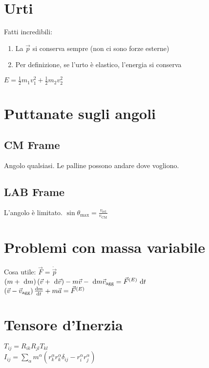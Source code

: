 \documentclass[a4paper,NoNotes,GeneralMath,12pt]{stdmdoc}
\begin{document}
	\section*{Urti}
	Fatti incredibili:
	\begin{enumerate}
		\item La $\vec{p}$ si conserva sempre (non ci sono forze esterne)
		\item Per definizione, se l'urto è elastico, l'energia si conserva
	\end{enumerate}
	$E = \frac{1}{2} m_1 v_1^2 + \frac{1}{2} m_2 v_2^2$

	\section*{Puttanate sugli angoli}
	\subsection*{CM Frame}
	Angolo qualsiasi. Le palline possono andare dove vogliono.

	\subsection*{LAB Frame}
	L'angolo è limitato. $\sin \theta_{\text{max}} = \frac{v_\text{rel}}{v_\text{CM}}$

	\section*{Problemi con massa variabile}
	Cosa utile: $\vec{F} = \dot{\vec{p}}$ \\
	$\left( m + \de m \right) \left( \vec{v} + \de \vec{v} \right) - m \vec{v} - \de m \vec{v}_\text{agg} = \vec{F}^{(E)} \de t$ \\ $\left( \vec{v} - \vec{v}_\text{agg} \right) \de{m}{t} + m \vec{a} = \vec{F}^{(E)}$

	\section*{Tensore d'Inerzia}
	$T_{ij} = R_{ik} R_{jl} T_{kl}$ \\ $I_{ij} = \sum_\alpha m^{\alpha} \left( r_k^\alpha r_k^\alpha \delta_{ij} - r_i^\alpha r_j^\alpha \right)$
\end{document}
